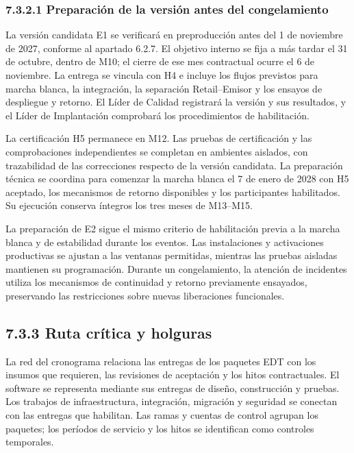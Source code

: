 \documentclass[11pt]{article}
\begin{document}
\subsubsection{7.3.2.1 Preparación de la versión antes del congelamiento}

La versión candidata E1 se verificará en preproducción antes del 1 de noviembre de 2027, conforme al apartado 6.2.7. El objetivo interno se fija a más tardar el 31 de octubre, dentro de M10; el cierre de ese mes contractual ocurre el 6 de noviembre. La entrega se vincula con H4 e incluye los flujos previstos para marcha blanca, la integración, la separación Retail--Emisor y los ensayos de despliegue y retorno. El Líder de Calidad registrará la versión y sus resultados, y el Líder de Implantación comprobará los procedimientos de habilitación.

La certificación H5 permanece en M12. Las pruebas de certificación y las comprobaciones independientes se completan en ambientes aislados, con trazabilidad de las correcciones respecto de la versión candidata. La preparación técnica se coordina para comenzar la marcha blanca el 7 de enero de 2028 con H5 aceptado, los mecanismos de retorno disponibles y los participantes habilitados. Su ejecución conserva íntegros los tres meses de M13--M15.

La preparación de E2 sigue el mismo criterio de habilitación previa a la marcha blanca y de estabilidad durante los eventos. Las instalaciones y activaciones productivas se ajustan a las ventanas permitidas, mientras las pruebas aisladas mantienen su programación. Durante un congelamiento, la atención de incidentes utiliza los mecanismos de continuidad y retorno previamente ensayados, preservando las restricciones sobre nuevas liberaciones funcionales.

\subsection{7.3.3 Ruta crítica y holguras}

La red del cronograma relaciona las entregas de los paquetes EDT con los insumos que requieren, las revisiones de aceptación y los hitos contractuales. El software se representa mediante sus entregas de diseño, construcción y pruebas. Los trabajos de infraestructura, integración, migración y seguridad se conectan con las entregas que habilitan. Las ramas y cuentas de control agrupan los paquetes; los períodos de servicio y los hitos se identifican como controles temporales.
\end{document}
